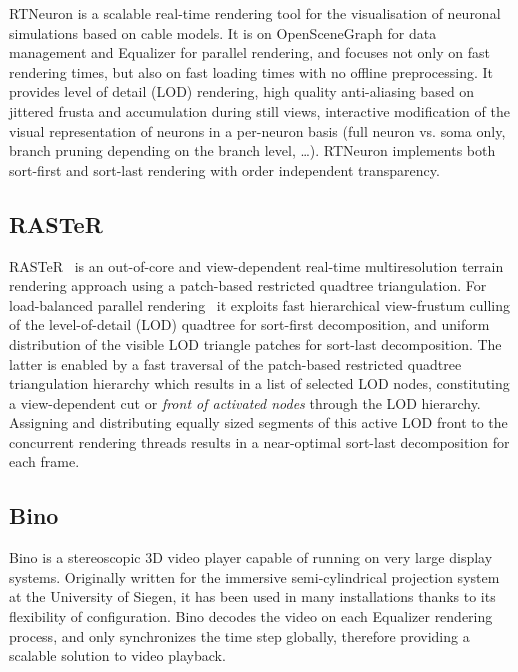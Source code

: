 \documentclass[10pt,journal,compsoc]{IEEEtran}
\begin{document}
RTNeuron \cite{HBBES:13} is a scalable real-time rendering tool for the
visualisation of neuronal simulations based on cable models. It is on
OpenSceneGraph for data management and Equalizer for parallel rendering, and
focuses not only on fast rendering times, but also on fast loading times with no
offline preprocessing. It provides level of detail (LOD) rendering, high quality
anti-aliasing based on jittered frusta and accumulation during still views,
interactive modification of the visual representation of neurons in a per-neuron
basis (full neuron vs. soma only, branch pruning depending on the branch level,
\dots). RTNeuron implements both sort-first and sort-last rendering with order
independent transparency.

\subsection{RASTeR}

RASTeR~\cite{BGP:09} is an out-of-core and view-dependent real-time multiresolution
terrain rendering approach using a patch-based restricted quadtree triangulation.
For load-balanced parallel rendering~\cite{GMBP:10} it exploits fast hierarchical
view-frustum culling of the level-of-detail (LOD) quadtree for sort-first decomposition, and
uniform distribution of the visible LOD triangle patches for sort-last decomposition.
The latter is enabled by a fast traversal of the patch-based restricted quadtree
triangulation hierarchy which results in a list of selected LOD nodes,
constituting a view-dependent cut or \emph{front of activated nodes} through the LOD hierarchy.
Assigning and distributing equally sized segments of this active LOD front to the concurrent
rendering threads results in a near-optimal sort-last decomposition for each frame.

\subsection{Bino}

Bino is a stereoscopic 3D video player capable of running on very large display
systems. Originally written for the immersive semi-cylindrical projection
system at the University of Siegen, it has been used in many installations
thanks to its flexibility of configuration. Bino decodes the video on each
Equalizer rendering process, and only synchronizes the time step globally,
therefore providing a scalable solution to video playback.
\end{document}
